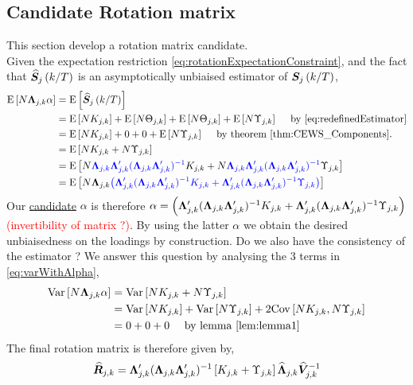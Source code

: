 \documentclass[main_document.tex]{subfiles}
\begin{document}
\subsection{Candidate Rotation matrix}
This section develop a rotation matrix candidate.\\
Given the expectation restriction \eqref{eq:rotationExpectationConstraint}, and the fact that $\widehat{\bm{S}}_{j}\left(k/T\right)$ is an asymptotically unbiaised estimator of $\bm{S}_{j}\left(k/T\right)$,
\begin{align*}
	\mathrm{E}\left[N \bm{\Lambda}_{j,k} \alpha\right] &= \mathrm{E}\left[\widehat{\bm{S}}_{j}\left(k/T\right)\right]\\
					   &= \mathrm{E}\left[N K_{j,k}\right] + \mathrm{E}\left[N \Theta_{j,k}\right] + \mathrm{E}\left[N \Theta_{j,k}\right] + \mathrm{E}\left[N \Upsilon_{j,k}\right] \quad \text{ by } \eqref{eq:redefinedEstimator}\\
					   &= \mathrm{E}\left[N K_{j,k}\right] +  0 +  0 + \mathrm{E}\left[N \Upsilon_{j,k}\right] \quad \text{ by theorem } \ref{thm:CEWS_Components}.\\
				   	   &= \mathrm{E}\left[N K_{j,k} + N \Upsilon_{j,k}\right]\\
					   &= \mathrm{E}\left[N \textcolor{blue}{\bm{\Lambda}_{j,k}\bm{\Lambda}_{j,k}'(\bm{\Lambda}_{j,k}\bm{\Lambda}_{j,k}')^{-1}} K_{j,k} + N \textcolor{blue}{\bm{\Lambda}_{j,k}\bm{\Lambda}_{j,k}'(\bm{\Lambda}_{j,k}\bm{\Lambda}_{j,k}')^{-1}}\Upsilon_{j,k}\right]\\
					   &= \mathrm{E}\left[N\bm{\Lambda}_{j,k}\textcolor{blue}{\left(\bm{\Lambda}_{j,k}'(\bm{\Lambda}_{j,k}\bm{\Lambda}_{j,k}')^{-1} K_{j,k} +\bm{\Lambda}_{j,k}'(\bm{\Lambda}_{j,k}\bm{\Lambda}_{j,k}')^{-1} \Upsilon_{j,k}\right)} \right]
\end{align*}
Our \underline{candidate} $\alpha$ is therefore $\alpha = \left(\bm{\Lambda}_{j,k}'(\bm{\Lambda}_{j,k}\bm{\Lambda}_{j,k}')^{-1} K_{j,k} +\bm{\Lambda}_{j,k}'(\bm{\Lambda}_{j,k}\bm{\Lambda}_{j,k}')^{-1} \Upsilon_{j,k}\right)$ \textcolor{red}{(invertibility of matrix ?)}. By using the latter $\alpha$ we obtain the desired unbiaisedness on the loadings by construction. Do we also have the consistency of the estimator ? We answer this question by analysing the 3 terms in \eqref{eq:varWithAlpha},
\begin{align*}
	\mathrm{Var}\left[N\bm{\Lambda}_{j,k}\alpha\right] &= \mathrm{Var}\left[N K_{j,k} + N \Upsilon_{j,k}\right] \\
					    &= \mathrm{Var}\left[N K_{j,k}\right] + \mathrm{Var}\left[N \Upsilon_{j,k}\right] + 2 \mathrm{Cov}\left[N K_{j,k},N \Upsilon_{j,k}\right]\\
					    &= 0 + 0 + 0 \quad \text{ by lemma } \ref{lem:lemma1} 
\end{align*}
The final rotation matrix is therefore given by, 
\begin{align}\label{eq:estimR}
	\widehat{\bm{R}}_{j,k} = \bm{\Lambda}_{j,k}'(\bm{\Lambda}_{j,k}\bm{\Lambda}_{j,k}')^{-1}\left[ K_{j,k} + \Upsilon_{j,k} \right]\widehat{\bm{\Lambda}}_{j,k}\widehat{\bm{V}}_{j,k}^{-1}
\end{align}
\end{document}
